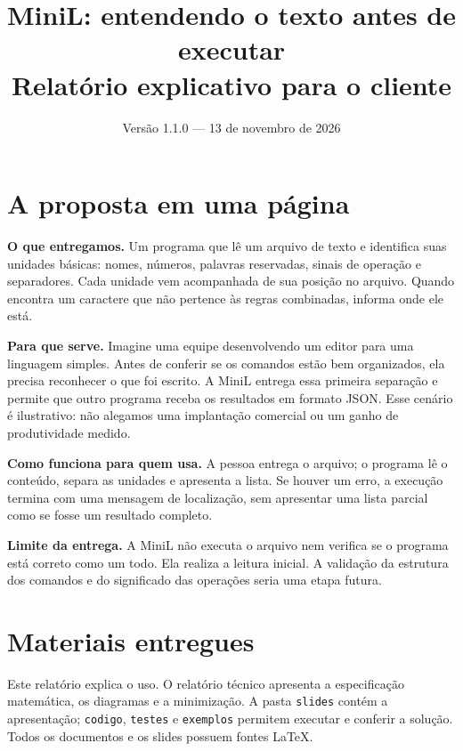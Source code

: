 \documentclass[12pt,a4paper]{article}
\title{\color{azul}\textbf{MiniL: entendendo o texto antes de executar}\\[3mm]
\large Relatório explicativo para o cliente}
\author{\normalsize\grupo}
\date{Versão 1.1.0 --- 13 de novembro de 2026}
\begin{document}
\maketitle
\section*{A proposta em uma página}
\textbf{O que entregamos.} Um programa que lê um arquivo de texto e identifica
suas unidades básicas: nomes, números, palavras reservadas, sinais de operação
e separadores. Cada unidade vem acompanhada de sua posição no arquivo. Quando
encontra um caractere que não pertence às regras combinadas, informa onde ele está.

\textbf{Para que serve.} Imagine uma equipe desenvolvendo um editor para uma
linguagem simples. Antes de conferir se os comandos estão bem organizados,
ela precisa reconhecer o que foi escrito. A MiniL entrega essa primeira
separação e permite que outro programa receba os resultados em formato JSON.
Esse cenário é ilustrativo: não alegamos uma implantação comercial ou um
ganho de produtividade medido.

\textbf{Como funciona para quem usa.} A pessoa entrega o arquivo; o programa
lê o conteúdo, separa as unidades e apresenta a lista. Se houver um erro,
a execução termina com uma mensagem de localização, sem apresentar uma lista
parcial como se fosse um resultado completo.

\begin{center}
\end{center}

\textbf{Limite da entrega.} A MiniL não executa o arquivo nem verifica se o
programa está correto como um todo. Ela realiza a leitura inicial. A validação
da estrutura dos comandos e do significado das operações seria uma etapa futura.

\section*{Materiais entregues}
Este relatório explica o uso. O relatório técnico apresenta a especificação
matemática, os diagramas e a minimização. A pasta \texttt{slides} contém a
apresentação; \texttt{codigo}, \texttt{testes} e \texttt{exemplos} permitem
executar e conferir a solução. Todos os documentos e os slides possuem fontes LaTeX.
\end{document}
